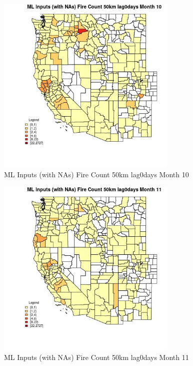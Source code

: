\begin{figure} 
\centering  
\includegraphics[width=0.77\textwidth]{Code_Outputs/Report_ML_input_PM25_Step4_part_f_de_duplicated_aveswNAs_CountyFire_Count_50km_lag0daysmedianMonth10.jpg} 
\caption{\label{fig:Report_ML_input_PM25_Step4_part_f_de_duplicated_aveswNAsCountyFire_Count_50km_lag0daysmedianMonth10}ML Inputs (with NAs) Fire Count 50km lag0days Month 10} 
\end{figure} 
 

\begin{figure} 
\centering  
\includegraphics[width=0.77\textwidth]{Code_Outputs/Report_ML_input_PM25_Step4_part_f_de_duplicated_aveswNAs_CountyFire_Count_50km_lag0daysmedianMonth11.jpg} 
\caption{\label{fig:Report_ML_input_PM25_Step4_part_f_de_duplicated_aveswNAsCountyFire_Count_50km_lag0daysmedianMonth11}ML Inputs (with NAs) Fire Count 50km lag0days Month 11} 
\end{figure} 
 

